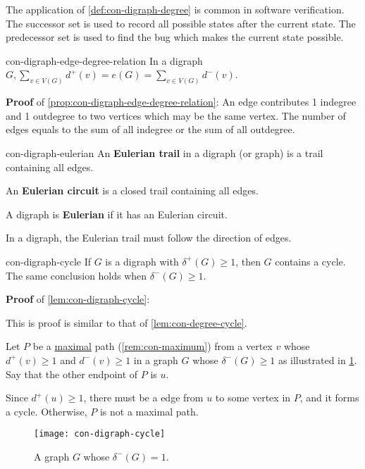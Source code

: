 \documentclass[../src/handouts/main.tex]{subfiles}
\begin{document}
The application of \cref{def:con-digraph-degree} is common in software verification. The successor set is used to record all possible states after the current state. The predecessor set is used to find the bug which makes the current state possible.

\begin{proposition}{}{con-digraph-edge-degree-relation}
  In a digraph $G, \sum _{v \in V(G)} d^{+}(v) = e(G) = \sum _{v \in V(G)} d^{-}(v)$.
\end{proposition}

\textbf{Proof} of \cref{prop:con-digraph-edge-degree-relation}: An edge contributes 1 indegree and 1 outdegree to two vertices which may be the same vertex. The number of edges equals to the sum of all indegree or the sum of all outdegree.

\begin{definition}{}{con-digraph-eulerian}
  An \textbf{Eulerian trail} in a digraph (or graph) is a trail containing all edges.

  An \textbf{Eulerian circuit} is a closed trail containing all edges.

  A digraph is \textbf{Eulerian} if it has an Eulerian circuit.
\end{definition}

In a digraph, the Eulerian trail must follow the direction of edges.

\begin{lemma}{}{con-digraph-cycle}
  If $G$ is a digraph with $\delta^{+}(G) \geq 1$, then $G$ contains a cycle. The same conclusion holds when $\delta^{-}(G) \geq 1$.
\end{lemma}

\textbf{Proof} of \cref{lem:con-digraph-cycle}:
\begin{enumerate*}
  \item This is proof is similar to that of \cref{lem:con-degree-cycle}.
  \item Let $P$ be a \underline{maximal} path (\cref{rem:con-maximum}) from a vertex $v$ whose $d^{+}(v) \geq 1$ and $d^{-}(v) \geq 1$ in a graph $G$ whose $\delta^{-}(G) \geq 1$ as illustrated in \cref{fig:con-digraph-cycle}. Say that the other endpoint of $P$ is $u$.
  \item Since $d^{+}(u) \geq 1$, there must be a edge from $u$ to some vertex in $P$, and it forms a cycle. Otherwise, $P$ is not a maximal path.
\end{enumerate*}

\begin{figure}[htbp]
  \centering
  \texttt{[image: con-digraph-cycle]}
  \caption{A graph $G$ whose $\delta^{-}(G) = 1$.}
  \label{fig:con-digraph-cycle}
\end{figure}
\end{document}
